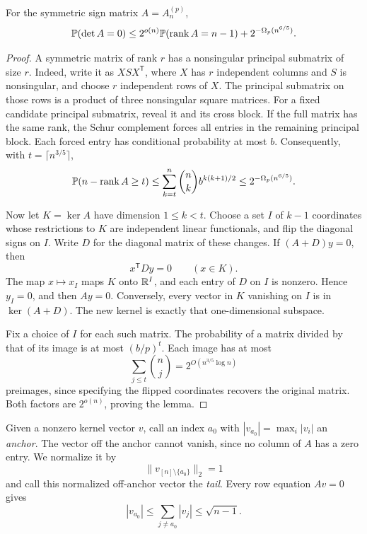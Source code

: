 \begin{lemma}\label{lem:corank-reduction}
For the symmetric sign matrix \(A=A_n^{(p)}\),
\[
 \mathbb P(\det A=0)
 \le 2^{o(n)}\mathbb P(\operatorname{rank} A=n-1)+2^{-\Omega_p(n^{6/5})}.
\]
\end{lemma}

\begin{proof}
A symmetric matrix of rank \(r\) has a nonsingular principal
submatrix of size \(r\). Indeed, write it as \(XSX^{\mathsf T}\),
where \(X\) has \(r\) independent columns and \(S\) is nonsingular,
and choose \(r\) independent rows of \(X\). The principal submatrix
on those rows is a product of three nonsingular square matrices.
For a fixed candidate principal submatrix, reveal it and its cross
block. If the full matrix has the same rank, the Schur complement
forces all entries in the remaining principal block. Each forced
entry has conditional probability at most \(b\). Consequently,
with \(t=\lceil n^{3/5}\rceil\),
\[
 \mathbb P(n-\operatorname{rank} A\ge t)
 \le \sum_{k=t}^n\binom nk b^{k(k+1)/2}
 \le 2^{-\Omega_p(n^{6/5})}.
\]

Now let \(K=\ker A\) have dimension \(1\le k<t\). Choose a set
\(I\) of \(k-1\) coordinates whose restrictions to \(K\) are
independent linear functionals, and flip the diagonal signs on \(I\).
Write \(D\) for the diagonal matrix of these changes. If
\((A+D)y=0\), then
\[
 x^{\mathsf T}Dy=0\qquad(x\in K).
\]
The map \(x\mapsto x_I\) maps \(K\) onto \(\mathbb R^I\), and each entry
of \(D\) on \(I\) is nonzero. Hence \(y_I=0\), and then \(Ay=0\).
Conversely, every vector in \(K\) vanishing on \(I\) is in
\(\ker(A+D)\). The new kernel is exactly that one-dimensional
subspace.

Fix a choice of \(I\) for each such matrix. The probability of a
matrix divided by that of its image is at most \((b/p)^t\).
Each image has at most
\[
 \sum_{j\le t}\binom nj=2^{O(n^{3/5}\log n)}
\]
preimages, since specifying the flipped coordinates recovers the
original matrix. Both factors are \(2^{o(n)}\), proving the lemma.
\end{proof}

Given a nonzero kernel vector \(v\), call an index \(a_0\) with
\(|v_{a_0}|=\max_i|v_i|\) an \emph{anchor}. The vector off the
anchor cannot vanish, since no column of \(A\) has a zero entry.
We normalize it by
\[
 \lVert v_{[n]\setminus\{a_0\}}\rVert_2=1
\]
and call this normalized off-anchor vector the \emph{tail}.
Every row equation \(Av=0\) gives
\begin{equation}\label{eq:anchor-size}
 |v_{a_0}|
 \le \sum_{j\ne a_0}|v_j|
 \le \sqrt{n-1}.
\end{equation}

